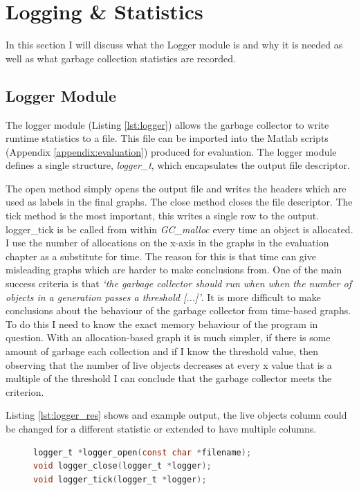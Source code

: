 \documentclass[../diss.tex]{subfiles}
\begin{document}
\section{Logging \& Statistics} \label{sec:logger}

In this section I will discuss what the Logger module is and why it is needed as well as what garbage collection statistics are recorded.

\subsection{Logger Module}

The logger module (Listing \ref{lst:logger}) allows the garbage collector to write runtime statistics to a file. This file can be imported into the Matlab scripts (Appendix \ref{appendix:evaluation}) produced for evaluation. The logger module defines a single structure, \emph{logger\_t}, which encapsulates the output file descriptor.

The open method simply opens the output file and writes the headers which are used as labels in the final graphs. The close method closes the file descriptor. The tick method is the most important, this writes a single row to the output. logger\_tick is be called from within \emph{GC\_malloc} every time an object is allocated. 
I use the number of allocations on the x-axis in the graphs in the evaluation chapter as a substitute for time. The reason for this is that time can give misleading graphs which are harder to make conclusions from. One of the main success criteria is that \emph{`the garbage collector should run when when the number of objects in a generation passes a threshold [...]'}. It is more difficult to make conclusions about the behaviour of the garbage collector from time-based graphs. To do this I need to know the exact memory behaviour of the program in question. With an allocation-based graph it is much simpler, if there is some amount of garbage each collection and if I know the threshold value, then observing that the number of live objects decreases at every x value that is a multiple of the threshold I can conclude that the garbage collector meets the criterion. 

Listing \ref{lst:logger_res} shows and example output, the live objects column could be changed for a different statistic or extended to have multiple columns.

\begin{figure}
\begin{lstlisting}[language=C, caption=Logger interface, label={lst:logger}]
logger_t *logger_open(const char *filename);
void logger_close(logger_t *logger);
void logger_tick(logger_t *logger);
\end{lstlisting}
\end{figure}
\end{document}
